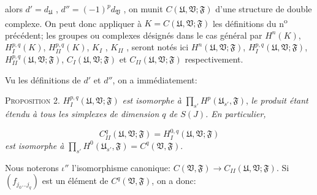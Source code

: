 
%
%
%
%
alors $d' = d_{\mathfrak{U}}$ , $d'' = (-1)^p d_{\mathfrak{V}}$ , on munit $C(\mathfrak{U}, \mathfrak{V}; \mathfrak{F})$ d'une structure de double complexe. On peut donc appliquer à $K = C(\mathfrak{U}, \mathfrak{V}; \mathfrak{F})$ les définitions du n\textsuperscript{o} précédent; les groupes ou complexes désignés dans le cas général par $H^n(K)$, $H_I^{p,q}(K)$, $H_{II}^{p,q}(K)$, $K_I$ , $K_{II}$ , seront notés ici $H^n(\mathfrak{U}, \mathfrak{V}; \mathfrak{F})$, $H_I^{p,q}(\mathfrak{U}, \mathfrak{V}; \mathfrak{F})$, $H_{II}^{p,q}(\mathfrak{U}, \mathfrak{V}; \mathfrak{F})$, $C_I(\mathfrak{U}, \mathfrak{V}; \mathfrak{F})$ et $C_{II}(\mathfrak{U}, \mathfrak{V}; \mathfrak{F})$ respectivement.

Vu les définitions de $d'$ et $d''$, on a immédiatement:

\textsc{Proposition} 2. $H_I^{p,q}(\mathfrak{U}, \mathfrak{V}; \mathfrak{F})$ \textit{est isomorphe à} $\prod_{s'} H^p(\mathfrak{U}_{s'} , \mathfrak{F})$, \textit{le produit étant étendu à tous les simplexes de dimension $q$ de $S(J)$. En particulier,}

\begin{equation*}
C_{II}^q(\mathfrak{U}, \mathfrak{V}; \mathfrak{F}) = H_I^{0,q}(\mathfrak{U}, \mathfrak{V}; \mathfrak{F})
\end{equation*}
\textit{est isomorphe à} $\prod_{s'} H^0(\mathfrak{U}_{s'} , \mathfrak{F}) = C^q(\mathfrak{V}, \mathfrak{F})$.

Nous noterons $\iota''$ l'isomorphisme canonique: $C(\mathfrak{V}, \mathfrak{F}) \rightarrow C_{II}(\mathfrak{U}, \mathfrak{V}; \mathfrak{F})$. Si $(f_{j_0 \ldots j_q})$ est un élément de $C^q(\mathfrak{V}, \mathfrak{F})$, on a donc:

